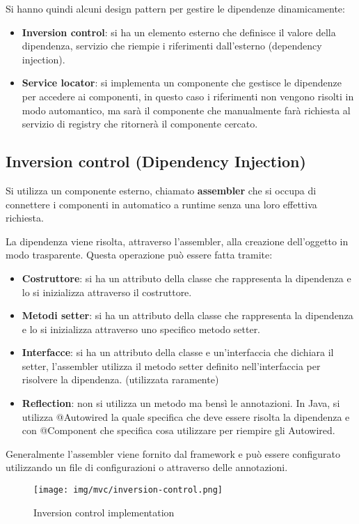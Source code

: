 Si hanno quindi alcuni design pattern per gestire le dipendenze dinamicamente:
\begin{itemize}
      \item \textbf{Inversion control}: si ha un elemento esterno che definisce
            il valore della dipendenza, servizio che riempie i riferimenti
            dall'esterno (dependency injection).
      \item \textbf{Service locator}: si implementa un componente che gestisce
            le dipendenze per accedere ai componenti, in questo caso i riferimenti
            non vengono risolti in modo automantico, ma sarà il componente che
            manualmente farà richiesta al servizio di registry che ritornerà il
            componente cercato.
\end{itemize}
\subsection{Inversion control (Dipendency Injection)}
Si utilizza un componente esterno, chiamato \textbf{assembler} che si occupa di
connettere i componenti in automatico a runtime senza una loro effettiva richiesta.

La dipendenza viene risolta, attraverso l'assembler, alla creazione dell'oggetto
in modo trasparente. Questa operazione può essere fatta tramite:
\begin{itemize}
      \item \textbf{Costruttore}: si ha un attributo della classe che rappresenta
            la dipendenza e lo si inizializza attraverso il costruttore.
      \item \textbf{Metodi setter}: si ha un attributo della classe che rappresenta
            la dipendenza e lo si inizializza attraverso uno specifico metodo
            setter.
      \item \textbf{Interfacce}: si ha un attributo della classe e un'interfaccia
            che dichiara il setter, l'assembler utilizza il metodo setter definito
            nell'interfaccia per risolvere la dipendenza. (utilizzata raramente)
      \item \textbf{Reflection}: non si utilizza un metodo ma bensì le annotazioni.
            In Java, si utilizza @Autowired la quale specifica che deve essere
            risolta la dipendenza e con @Component che specifica cosa utilizzare
            per riempire gli Autowired.
\end{itemize}
Generalmente l'assembler viene fornito dal framework e può essere configurato
utilizzando un file di configurazioni o attraverso delle annotazioni.
\begin{figure}[!ht]
      \centering
      \texttt{[image: img/mvc/inversion-control.png]}
      \caption{Inversion control implementation}
\end{figure}
